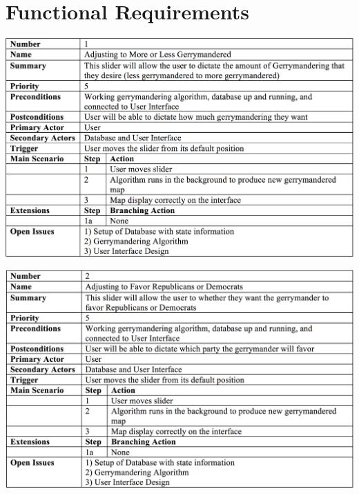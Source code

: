 \documentclass{article}
\begin{document}

\section{Functional Requirements}\label{sec:functionalReq}

\vspace{2.5mm}

\begin{addmargin}[4em]{0em}


\begin{center}
\hspace*{-2cm}      
\includegraphics[scale=.25]{Slider1.png}
\end{center}

\begin{center}
\hspace*{-2cm}      
\includegraphics[scale=.25]{Slider2.png}
\end{center}


\end{addmargin}
\end{document}

